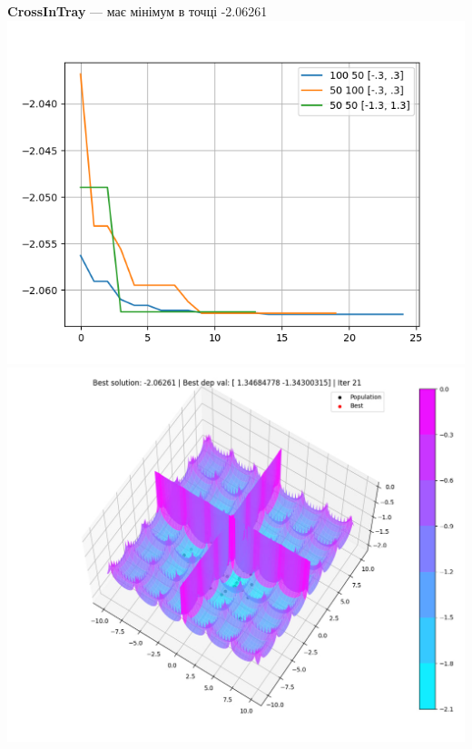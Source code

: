 \documentclass{article}
\begin{document}
        \newpage
        \textbf{CrossInTray} --- має мінімум в точці -2.06261
            \newline
            \includegraphics[scale=0.7]{CrossInTray_dif.png}
            \newline
            \includegraphics[scale=0.7]{CrossInTray.jpg}
            \newline
\end{document}
